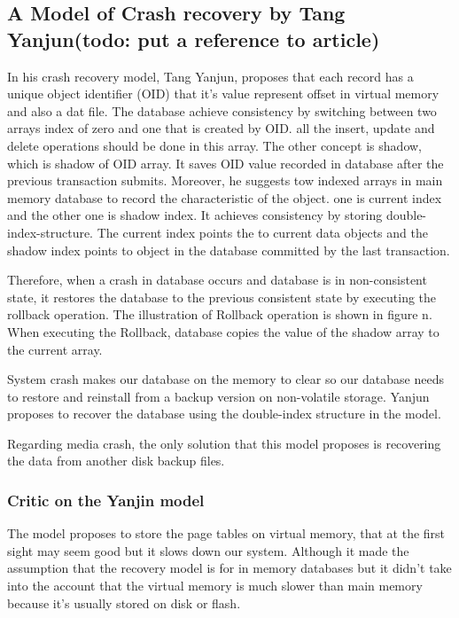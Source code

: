 \documentclass[12pt]{article} %
\begin{document}
\subsection{A Model of Crash recovery by Tang Yanjun(todo: put a reference to article)}

In his crash recovery model, Tang Yanjun, proposes that each record has a unique object identifier (OID) that it’s value represent offset in virtual memory and also a dat file. The database achieve consistency by switching between two arrays index of zero and one that is created by OID. all the insert, update and delete operations should be done in this array. The other concept is shadow, which is shadow of OID array. It saves OID value recorded in database after the previous transaction submits. Moreover, he suggests tow indexed arrays in main memory database to record the characteristic of the object. one is current index and the other one is shadow index. It achieves consistency by storing double-index-structure. The current index points the to current data objects and the shadow index points to object in the database committed by the last transaction.

Therefore, when a crash in database occurs and database is in non-consistent state, it restores the database to the previous consistent state by executing the rollback operation. The illustration of Rollback operation is shown in figure n. When executing the Rollback, database copies the value of the shadow array to the current array.

System crash makes our database on the memory to clear so our database needs to restore and reinstall from a backup version on non-volatile storage. Yanjun proposes to recover the database using the double-index structure in the model.

Regarding media crash, the only solution that this model proposes is recovering the data from another disk backup files.

\subsubsection{Critic on the Yanjin model}

The model proposes to store the page tables on virtual memory, that at the first sight may seem good but it slows down our system. Although it made the assumption that the recovery model is for in memory databases but it didn’t take into the account that the virtual memory is much slower than main memory because it’s usually stored on disk or flash.
\end{document}
